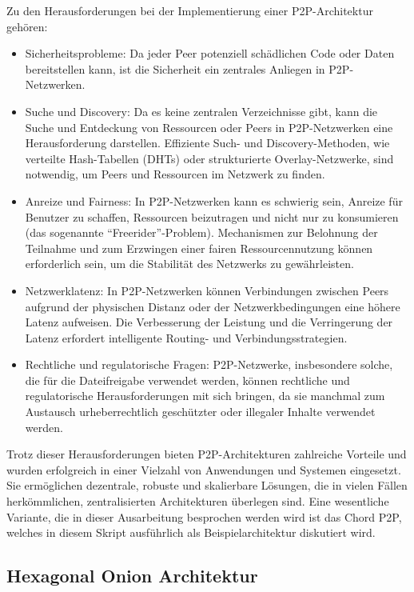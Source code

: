 \documentclass[../vs-script-first-v01.tex]{subfiles}
\begin{document}
Zu den Herausforderungen bei der Implementierung einer P2P-Architektur gehören:
\begin{itemize}
\item Sicherheitsprobleme: Da jeder Peer potenziell schädlichen Code oder Daten bereitstellen kann, ist die Sicherheit ein zentrales Anliegen in P2P-Netzwerken.
\item Suche und Discovery: Da es keine zentralen Verzeichnisse gibt, kann die Suche und Entdeckung von Ressourcen oder Peers in P2P-Netzwerken eine Herausforderung darstellen. Effiziente Such- und Discovery-Methoden, wie verteilte Hash-Tabellen (DHTs) oder strukturierte Overlay-Netzwerke, sind notwendig, um Peers und Ressourcen im Netzwerk zu finden.
\item Anreize und Fairness: In P2P-Netzwerken kann es schwierig sein, Anreize für Benutzer zu schaffen, Ressourcen beizutragen und nicht nur zu konsumieren (das sogenannte \enquote{Freerider}-Problem). Mechanismen zur Belohnung der Teilnahme und zum Erzwingen einer fairen Ressourcennutzung können erforderlich sein, um die Stabilität des Netzwerks zu gewährleisten.
\item Netzwerklatenz: In P2P-Netzwerken können Verbindungen zwischen Peers aufgrund der physischen Distanz oder der Netzwerkbedingungen eine höhere Latenz aufweisen. Die Verbesserung der Leistung und die Verringerung der Latenz erfordert intelligente Routing- und Verbindungsstrategien.
\item Rechtliche und regulatorische Fragen: P2P-Netzwerke, insbesondere solche, die für die Dateifreigabe verwendet werden, können rechtliche und regulatorische Herausforderungen mit sich bringen, da sie manchmal zum Austausch urheberrechtlich geschützter oder illegaler Inhalte verwendet werden.   
\end{itemize}
Trotz dieser Herausforderungen bieten P2P-Architekturen zahlreiche Vorteile und wurden erfolgreich in einer Vielzahl von Anwendungen und Systemen eingesetzt. Sie ermöglichen dezentrale, robuste und skalierbare Lösungen, die in vielen Fällen herkömmlichen, zentralisierten Architekturen überlegen sind. Eine wesentliche Variante, die in dieser Ausarbeitung besprochen werden wird ist das Chord P2P, welches in diesem Skript ausführlich als Beispielarchitektur diskutiert wird. 

\subsection{Hexagonal Onion Architektur}
\end{document}
